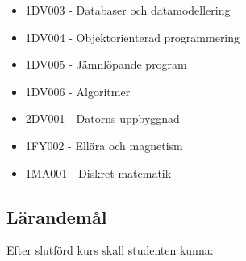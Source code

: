 \begin{itemize}
\tightlist
\item
  1DV003 - Databaser och datamodellering
\item
  1DV004 - Objektorienterad programmering
\item
  1DV005 - Jämnlöpande program
\item
  1DV006 - Algoritmer
\item
  2DV001 - Datorns uppbyggnad
\item
  1FY002 - Ellära och magnetism
\item
  1MA001 - Diskret matematik
\end{itemize}

\subsection*{Lärandemål}

Efter slutförd kurs skall studenten kunna:

